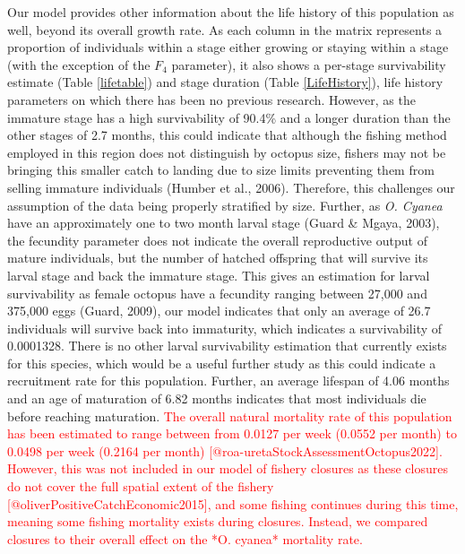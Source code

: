 \documentclass[
]{article}
\begin{document}
Our model provides other information about the life history of this population as well, beyond its overall growth rate. As each column in the matrix represents a proportion of individuals within a stage either growing or staying within a stage (with the exception of the \(F_4\) parameter), it also shows a per-stage survivability estimate (Table \ref{lifetable}) and stage duration (Table \ref{LifeHistory}), life history parameters on which there has been no previous research. However, as the immature stage has a high survivability of 90.4\% and a longer duration than the other stages of 2.7 months, this could indicate that although the fishing method employed in this region does not distinguish by octopus size, fishers may not be bringing this smaller catch to landing due to size limits preventing them from selling immature individuals (Humber et al., 2006). Therefore, this challenges our assumption of the data being properly stratified by size. Further, as \emph{O. Cyanea} have an approximately one to two month larval stage (Guard \& Mgaya, 2003), the fecundity parameter does not indicate the overall reproductive output of mature individuals, but the number of hatched offspring that will survive its larval stage and back the immature stage. This gives an estimation for larval survivability as female octopus have a fecundity ranging between 27,000 and 375,000 eggs (Guard, 2009), our model indicates that only an average of 26.7 individuals will survive back into immaturity, which indicates a survivability of 0.0001328. There is no other larval survivability estimation that currently exists for this species, which would be a useful further study as this could indicate a recruitment rate for this population. Further, an average lifespan of 4.06 months and an age of maturation of 6.82 months indicates that most individuals die before reaching maturation. \textcolor{red}{The overall natural mortality rate of this population has been estimated to range between from 0.0127 per week (0.0552 per month) to 0.0498 per week (0.2164 per month) [@roa-uretaStockAssessmentOctopus2022]. However, this was not included in our model of fishery closures as these closures do not cover the full spatial extent of the fishery [@oliverPositiveCatchEconomic2015], and some fishing continues during this time, meaning some fishing mortality exists during closures. Instead, we compared closures to their overall effect on the *O. cyanea* mortality rate.}
\end{document}
